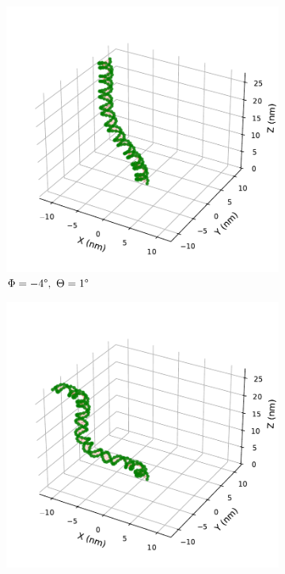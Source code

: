 \documentclass[a4paper,10pt]{article}
\begin{document}
\begin{figure}[htbp]
\centering
\begin{subfigure}{0.3\textwidth}
\includegraphics[width=\textwidth]{bw_-4_1.pdf}
\caption{$\Phi=-4\degree,\ \Theta=1\degree$}
\label{fig:bend_a}
\end{subfigure}
\begin{subfigure}{0.3\textwidth}
\includegraphics[width=\textwidth]{bw_-4_3.pdf}

\end{subfigure}
\end{figure}
\end{document}
